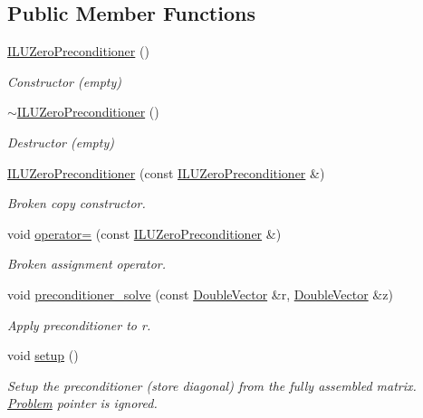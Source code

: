 \subsection*{Public Member Functions}
\begin{DoxyCompactItemize}
\item 
\hyperlink{classoomph_1_1ILUZeroPreconditioner_3_01CCDoubleMatrix_01_4_afe9c5666258b17786708bd9d8932ca07}{I\+L\+U\+Zero\+Preconditioner} ()
\begin{DoxyCompactList}\small\item\em Constructor (empty) \end{DoxyCompactList}\item 
\hyperlink{classoomph_1_1ILUZeroPreconditioner_3_01CCDoubleMatrix_01_4_ac9363d1ec8be489fe89a1379873d5c4d}{$\sim$\+I\+L\+U\+Zero\+Preconditioner} ()
\begin{DoxyCompactList}\small\item\em Destructor (empty) \end{DoxyCompactList}\item 
\hyperlink{classoomph_1_1ILUZeroPreconditioner_3_01CCDoubleMatrix_01_4_a02cee596e1a0709a82dfd1029e4c100d}{I\+L\+U\+Zero\+Preconditioner} (const \hyperlink{classoomph_1_1ILUZeroPreconditioner}{I\+L\+U\+Zero\+Preconditioner} \&)
\begin{DoxyCompactList}\small\item\em Broken copy constructor. \end{DoxyCompactList}\item 
void \hyperlink{classoomph_1_1ILUZeroPreconditioner_3_01CCDoubleMatrix_01_4_a8b5242824978d267f091997895c99b9d}{operator=} (const \hyperlink{classoomph_1_1ILUZeroPreconditioner}{I\+L\+U\+Zero\+Preconditioner} \&)
\begin{DoxyCompactList}\small\item\em Broken assignment operator. \end{DoxyCompactList}\item 
void \hyperlink{classoomph_1_1ILUZeroPreconditioner_3_01CCDoubleMatrix_01_4_adadad5eca4d828d3d8a07547d83bd9a6}{preconditioner\+\_\+solve} (const \hyperlink{classoomph_1_1DoubleVector}{Double\+Vector} \&r, \hyperlink{classoomph_1_1DoubleVector}{Double\+Vector} \&z)
\begin{DoxyCompactList}\small\item\em Apply preconditioner to r. \end{DoxyCompactList}\item 
void \hyperlink{classoomph_1_1ILUZeroPreconditioner_3_01CCDoubleMatrix_01_4_ab72053725965ff961b01d6dc6d77c819}{setup} ()
\begin{DoxyCompactList}\small\item\em Setup the preconditioner (store diagonal) from the fully assembled matrix. \hyperlink{classoomph_1_1Problem}{Problem} pointer is ignored. \end{DoxyCompactList}\end{DoxyCompactItemize}
